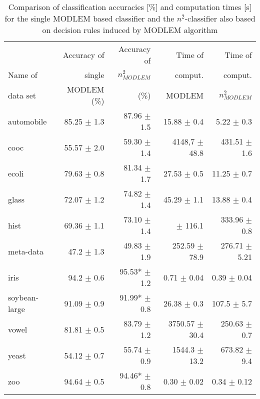 \documentclass{llncs}
\begin{document}
\begin{table}
\centering \caption{Comparison of classification accuracies [\%] and
computation times [s] for the single MODLEM based classifier and the
$n^2$-classifier also based on decision rules induced by MODLEM algorithm}
\begin{tabular}{lrrrr}
\hline\noalign{\smallskip}
  & Accuracy of &\quad Accuracy of &\quad
Time of &\quad Time of \\ Name of  & single &\quad $n^2_{MODLEM}$ &\quad
comput. & comput. \\ data set
 & MODLEM  (\%) &(\%) \quad & \quad MODLEM & \quad $n^2_{MODLEM}$ \\
 \hline
 automobile & 85.25 \scriptsize{$\pm$ 1.3} & 87.96 \scriptsize{$\pm$ 1.5}
& 15.88 \scriptsize{$\pm$ 0.4}& 5.22 \scriptsize{$\pm$ 0.3} \\ cooc & 55.57
\scriptsize{$\pm$ 2.0} & 59.30 \scriptsize{$\pm$ 1.4} & 4148,7
\scriptsize{$\pm$ 48.8} & 431.51 \scriptsize{$\pm$ 1.6} \\  ecoli & 79.63
\scriptsize{$\pm$  0.8} & 81.34 \scriptsize{$\pm$ 1.7} & 27.53
\scriptsize{$\pm$ 0.5} & 11.25 \scriptsize{$\pm$ 0.7}\\  glass & 72.07
\scriptsize{$\pm$  1.2} & 74.82 \scriptsize{$\pm$ 1.4} & 45.29
\scriptsize{$\pm$ 1.1} & 13.88 \scriptsize{$\pm$ 0.4} \\  hist & 69.36
\scriptsize{$\pm$  1.1} & 73.10 \scriptsize{$\pm$ 1.4} & \quad 3563.79
\scriptsize{$\pm$ 116.1} & 333.96 \scriptsize{$\pm$ 0.8} \\ meta-data & 47.2
\scriptsize{$\pm$ 1.3} & 49.83 \scriptsize{$\pm$ 1.9} & 252.59
\scriptsize{$\pm$ 78.9} & 276.71 \scriptsize{$\pm$ 5.21} \\  iris & 94.2
\scriptsize{$\pm$ 0.6 }& 95.53* \scriptsize{$\pm$ 1.2} & 0.71
\scriptsize{$\pm$ 0.04 } &  0.39 \scriptsize{$\pm$ 0.04} \\ soybean-large &
91.09 \scriptsize{$\pm$ 0.9 }& 91.99* \scriptsize{$\pm$ 0.8} & 26.38
\scriptsize{$\pm$ 0.3} & 107.5 \scriptsize{$\pm$ 5.7} \\  vowel & 81.81
\scriptsize{$\pm$ 0.5} & 83.79 \scriptsize{$\pm$ 1.2} & 3750.57
\scriptsize{$\pm$ 30.4} & 250.63 \scriptsize{$\pm$ 0.7} \\  yeast & 54.12
\scriptsize{$\pm$ 0.7} & 55.74 \scriptsize{$\pm$ 0.9} &  1544.3
\scriptsize{$\pm$ 13.2} & 673.82 \scriptsize{$\pm$ 9.4}\\ zoo & 94.64
\scriptsize{$\pm$ 0.5} & 94.46* \scriptsize{$\pm$ 0.8} & 0.30
\scriptsize{$\pm$ 0.02} & 0.34 \scriptsize{$\pm$ 0.12} \\ \hline
\end{tabular}
\end{table}
\end{document}
